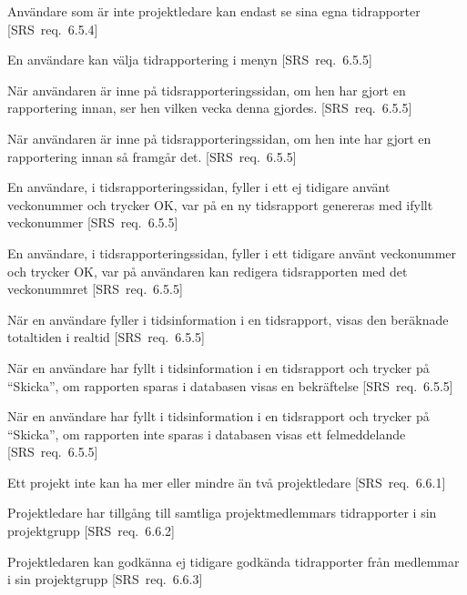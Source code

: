 \documentclass[a4paper]{article}
\begin{document}
\begin{appendices}
\begin{FT}
\item
Användare som är inte projektledare kan endast se sina egna tidrapporter [SRS~req.~6.5.4]

\item 
En användare kan välja tidrapportering i menyn [SRS~req.~6.5.5]

\item
När användaren är inne på tidsrapporteringssidan, om hen har gjort en rapportering innan, ser hen vilken vecka denna gjordes. [SRS~req.~6.5.5]

\item
När användaren är inne på tidsrapporteringssidan, om hen inte har gjort en rapportering innan så framgår det. [SRS~req.~6.5.5]

\item
En användare, i tidsrapporteringssidan, fyller i ett ej tidigare använt veckonummer och trycker OK, var på en ny tidsrapport genereras med ifyllt veckonummer [SRS~req.~6.5.5]

\item
En användare, i tidsrapporteringssidan, fyller i ett tidigare använt veckonummer och trycker OK, var på användaren kan redigera tidsrapporten med det veckonummret [SRS~req.~6.5.5]

\item 
När en användare fyller i tidsinformation i en tidsrapport, visas den beräknade totaltiden i realtid [SRS~req.~6.5.5]

\item
När en användare har fyllt i tidsinformation i en tidsrapport och trycker på ``Skicka'', om rapporten sparas i databasen visas en bekräftelse [SRS~req.~6.5.5]

\item
När en användare har fyllt i tidsinformation i en tidsrapport och trycker på ``Skicka'', om rapporten inte sparas i databasen visas ett felmeddelande [SRS~req.~6.5.5]

\item
Ett projekt inte kan ha mer eller mindre än två projektledare [SRS~req.~6.6.1]

\item
Projektledare har tillgång till samtliga projektmedlemmars tidrapporter i sin projektgrupp [SRS~req.~6.6.2]

\item
Projektledaren kan godkänna ej tidigare godkända tidrapporter från medlemmar i sin projektgrupp [SRS~req.~6.6.3]


\end{FT}
\end{appendices}
\end{document}

